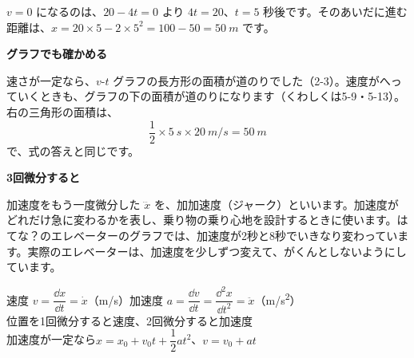 $v=0$ になるのは、$20-4t=0$ より $4t=20$、$t=5$ 秒後です。そのあいだに進む距離は、$x=20\times5-2\times5^2=100-50=\qty{50}{m}$ です。

\vspace{4pt}
\noindent\begin{minipage}[c]{0.5\linewidth}
\textbf{グラフでも確かめる}\par
速さが一定なら、$v$-$t$ グラフの長方形の面積が道のりでした（2-3）。速度がへっていくときも、グラフの下の面積が道のりになります（くわしくは5-9・5-13）。右の三角形の面積は、
\[ \frac{1}{2}\times\qty{5}{s}\times\qty{20}{m/s}=\qty{50}{m} \]
で、式の答えと同じです。
\end{minipage}\hfill
\begin{minipage}[c]{0.46\linewidth}\centering
{}
\end{minipage}

\begin{motto}[3]
\textbf{3回微分すると}\par
加速度をもう一度微分した $\dddot{x}$ を、加加速度（ジャーク）といいます。加速度がどれだけ急に変わるかを表し、乗り物の乗り心地を設計するときに使います。はてな？のエレベーターのグラフでは、加速度が2秒と8秒でいきなり変わっています。実際のエレベーターは、加速度を少しずつ変えて、がくんとしないようにしています。
\end{motto}

\begin{taisetsu}
速度 $v=\dfrac{\dd x}{\dd t}=\dot{x}$（m/s）\qquad 加速度 $a=\dfrac{\dd v}{\dd t}=\dfrac{\dd^2x}{\dd t^2}=\ddot{x}$（\unit{m/s^2}）\\
位置を1回微分すると速度、2回微分すると加速度\\
加速度が一定なら\quad $x=x_0+v_0t+\dfrac{1}{2}at^2$、\enspace$v=v_0+at$
\end{taisetsu}

\begin{kotoba}
\small
{}
\end{kotoba}


